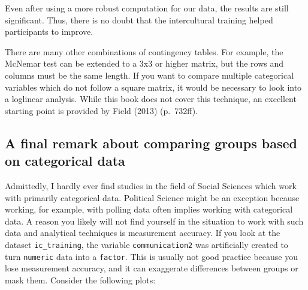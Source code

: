 \documentclass[
  letterpaper,
  DIV=11,
  numbers=noendperiod]{scrreprt}
\begin{document}
Even after using a more robust computation for our data, the results are
still significant. Thus, there is no doubt that the intercultural
training helped participants to improve.

There are many other combinations of contingency tables. For example,
the McNemar test can be extended to a 3x3 or higher matrix, but the rows
and columns must be the same length. If you want to compare multiple
categorical variables which do not follow a square matrix, it would be
necessary to look into a loglinear analysis. While this book does not
cover this technique, an excellent starting point is provided by Field
(2013) (p.~732ff).

\subsection{A final remark about comparing groups based on categorical
data}\label{sec-a-final-remark-about-comparing-groups-based-on-categorical-data}

Admittedly, I hardly ever find studies in the field of Social Sciences
which work with primarily categorical data. Political Science might be
an exception because working, for example, with polling data often
implies working with categorical data. A reason you likely will not find
yourself in the situation to work with such data and analytical
techniques is measurement accuracy. If you look at the dataset
\texttt{ic\_training}, the variable \texttt{communication2} was
artificially created to turn \texttt{numeric} data into a
\texttt{factor}. This is usually not good practice because you lose
measurement accuracy, and it can exaggerate differences between groups
or mask them. Consider the following plots:
\end{document}
